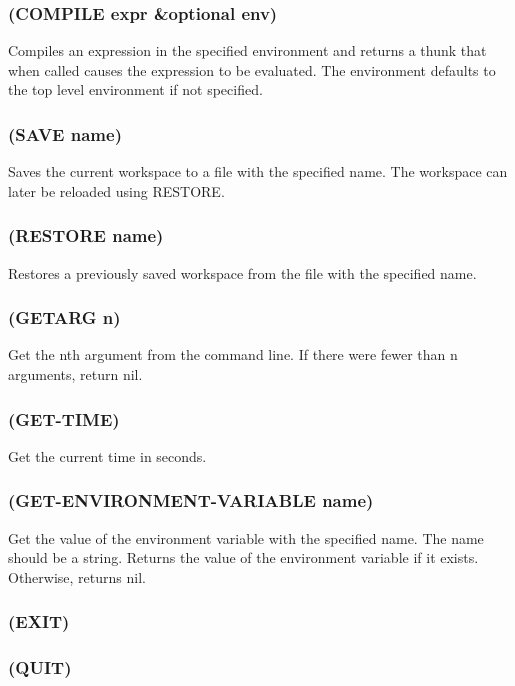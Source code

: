 \documentclass[11pt]{article}
\begin{document}
\subsubsection{(COMPILE expr \&optional env)}
\label{sec-4-41-6}

Compiles an expression in the specified environment and returns a
thunk that when called causes the expression to be evaluated.  The
environment defaults to the top level environment if not specified.
\subsubsection{(SAVE name)}
\label{sec-4-41-7}

Saves the current workspace to a file with the specified name.  The
workspace can later be reloaded using RESTORE.
\subsubsection{(RESTORE name)}
\label{sec-4-41-8}

Restores a previously saved workspace from the file with the
specified name.
\subsubsection{(GETARG n)}
\label{sec-4-41-9}

Get the nth argument from the command line.  If there were fewer than
n arguments, return nil.
\subsubsection{(GET-TIME)}
\label{sec-4-41-10}

Get the current time in seconds.
\subsubsection{(GET-ENVIRONMENT-VARIABLE name)}
\label{sec-4-41-11}

Get the value of the environment variable with the specified name.
The name should be a string.  Returns the value of the environment
variable if it exists.  Otherwise, returns nil.
\subsubsection{(EXIT)}
\label{sec-4-41-12}
\subsubsection{(QUIT)}
\label{sec-4-41-13}
\end{document}
